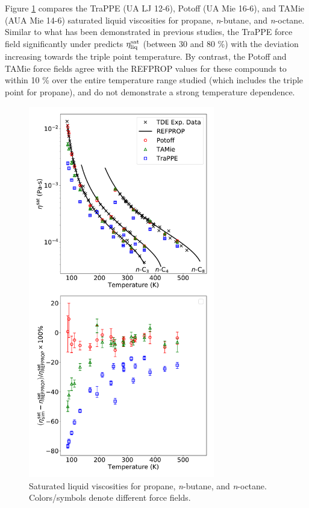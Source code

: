 \documentclass[preprint,review,12pt]{elsarticle}
\begin{document}
	Figure \ref{fig:Saturation_C3_C4_C8} compares the TraPPE (UA LJ 12-6), Potoff (UA Mie 16-6), and TAMie (AUA Mie 14-6) saturated liquid viscosities for propane, \textit{n}-butane, and \textit{n}-octane. Similar to what has been demonstrated in previous studies, the TraPPE force field significantly under predicts $\eta_{\rm liq}^{\rm sat}$ (between 30 and 80 \%) with the deviation increasing towards the triple point temperature. By contrast, the Potoff and TAMie force fields agree with the REFPROP values for these compounds to within 10 \% over the entire temperature range studied (which includes the triple point for propane), and do not demonstrate a strong temperature dependence.  
	
	\begin{figure}[htb!]
		\centering
		\includegraphics[width=3.2in]{compare_force_fields_C3_C4_C8.pdf}
		\caption{Saturated liquid viscosities for propane, \textit{n}-butane, and \textit{n}-octane. Colors/symbols denote different force fields.}
		\label{fig:Saturation_C3_C4_C8}
	\end{figure} 
	
\end{document}
